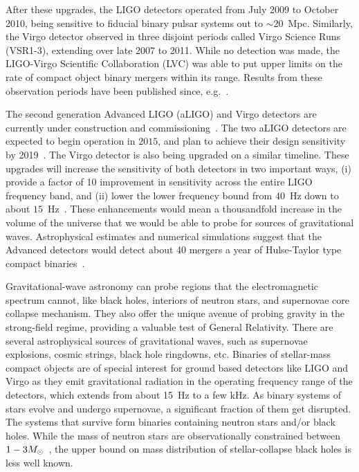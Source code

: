 After these upgrades, the LIGO detectors operated from July 2009
to October 2010, being sensitive to fiducial binary pulsar systems out to 
$\sim 20$~Mpc. 
Similarly, the Virgo detector observed in three disjoint periods called Virgo 
Science Runs (VSR1-3), extending over late 2007 to 2011.
While no detection was made, the LIGO-Virgo Scientific Collaboration
(LVC) was able to put upper limits on the rate of compact object binary mergers
within its range. Results from these observation periods have been published 
since, e.g.~\cite{Messaritaki:2005wv,Abadie:2010mt,Abadie:2012rq,Abbott:2009km,
Colaboration:2011nz,Abadie:2010yb,Abbott:2009qj,Abbott:2009tt,Abadie:2011kd,
Aasi:2012rja,Abbott:2003yq,Abbott:2005pu,Sintes:2005fp,Abadie:2011md,
Palomba:2012wn}. 

The second generation Advanced LIGO (aLIGO) and Virgo detectors are currently
under construction and commissioning~\cite{Harry:2010zz,aVIRGO}.
The two aLIGO detectors are expected to begin operation in $2015$, and
plan to achieve their design sensitivity by 2019~\cite{Aasi:2013wya}. 
The Virgo detector is also being upgraded on a similar timeline. 
These upgrades will increase the sensitivity of both detectors in two 
important ways, (i) provide a factor of 10 improvement in sensitivity 
across the entire LIGO frequency band, and (ii) lower the lower frequency
bound from $40$~Hz down to about $15$~Hz~\cite{Harry:2010zz}. 
These enhancements would mean a thousandfold increase in the volume of the
universe that we would be able to probe for sources of gravitational waves. 
Astrophysical estimates and numerical simulations suggest that the Advanced
detectors would detect about 40 mergers a year of Hulse-Taylor type compact
binaries~\cite{LSCCBCRates2010}. 


Gravitational-wave astronomy can probe regions that the electromagnetic
spectrum cannot, like black holes, interiors of neutron stars, and 
supernovae core collapse mechanism.
They also offer the unique avenue of probing gravity in 
the strong-field regime, providing a valuable test of General Relativity.
There are several astrophysical sources of gravitational waves, such as 
supernovae explosions, cosmic strings, black hole ringdowns, etc. 
Binaries of stellar-mass compact objects are of special interest for 
ground based detectors like LIGO and Virgo as they emit gravitational 
radiation in the operating frequency range of the detectors, which
extends from about 15~Hz to a few kHz. As binary systems of 
stars evolve and undergo supernovae, a significant 
fraction of them get disrupted. The systems that survive form binaries
containing neutron stars and/or black holes. While the mass of neutron
stars are observationally constrained between $1-3M_\odot$~\cite{},
the upper bound on mass distribution of stellar-collapse black holes 
is less well known. 

